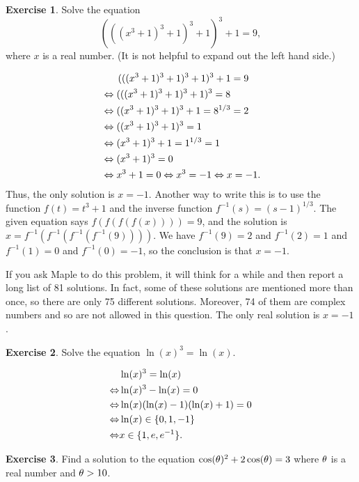 \documentclass[a4paper]{amsart}
\theoremstyle{definition}
\newtheorem{exercise}{Exercise}[section]
\newenvironment{solution}{{\noindent \bf Solution:}}{}
\begin{document}
\begin{exercise}\label{ex-cubic-comp}
Solve the equation
 \[ (((x^3+1)^3+1)^3+1)^3+1=9, \]
 where $x$ is a real number.  (It is not helpful to expand
 out the left hand side.)
\end{exercise}
\begin{solution}
\begin{align*}
   &\hspace{1.7em} (((x^3+1)^3+1)^3+1)^3+1=9 \\
   &\Leftrightarrow (((x^3+1)^3+1)^3+1)^3=8 \\
   &\Leftrightarrow ((x^3+1)^3+1)^3+1=8^{1/3}=2 \\
   &\Leftrightarrow ((x^3+1)^3+1)^3=1 \\
   &\Leftrightarrow (x^3+1)^3+1=1^{1/3}=1 \\
   &\Leftrightarrow (x^3+1)^3=0 \\
   &\Leftrightarrow x^3+1=0 \Leftrightarrow x^3=-1 \Leftrightarrow x=-1.
 \end{align*}
 Thus, the only solution is $x=-1$.  Another way to write this is to
 use the function $f(t)=t^3+1$ and the inverse function
 $f^{-1}(s)=(s-1)^{1/3}$.  The given equation says $f(f(f(f(x))))=9$,
 and the solution is $x=f^{-1}(f^{-1}(f^{-1}(f^{-1}(9))))$.  We have
 $f^{-1}(9)=2$ and $f^{-1}(2)=1$ and $f^{-1}(1)=0$ and $f^{-1}(0)=-1$,
 so the conclusion is that $x=-1$.

 If you ask Maple to do this problem, it will think for a
 while and then report a long list of 81 solutions.  In fact,
 some of these solutions are mentioned more than once, so
 there are only 75 different solutions.  Moreover, 74 of
 them are complex numbers and so are not allowed in this
 question.  The only real solution is $x=-1$.
\end{solution}
\begin{exercise}\label{ex-cubic-log}
Solve the equation $\ln(x)^3=\ln(x)$.
\end{exercise}
\begin{solution}
 \begin{align*}
         & \ln(x)^3 = \ln(x) \\
   \Leftrightarrow & \ln(x)^3 - \ln(x) = 0 \\
   \Leftrightarrow & \ln(x)(\ln(x)-1)(\ln(x)+1) = 0 \\
   \Leftrightarrow & \ln(x) \in \{0,1,-1\}  \\
   \Leftrightarrow & x \in \{1,e,e^{-1}\}.
 \end{align*}
\end{solution}
\begin{exercise}\label{ex-quad-cos}
Find a solution to the equation $\cos(\theta)^2+2\cos(\theta)=3$ where
 $\theta$ is a real number and $\theta>10$.
\end{exercise}
\end{document}
